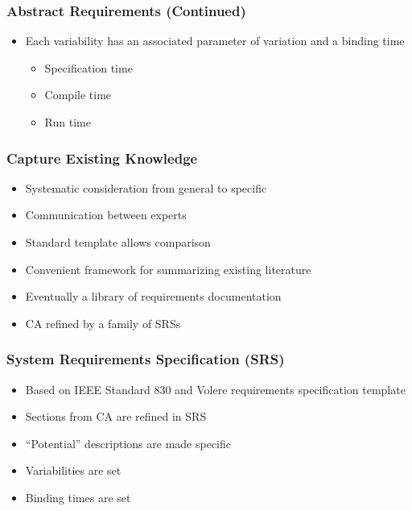 \documentclass[t,12pt,numbers,fleqn]{beamer}
\newcounter{temp}
\begin{document}

\begin{frame}

\frametitle{Abstract Requirements (Continued)}

\begin{itemize}
\item Each variability has an associated parameter of variation and a binding time
\begin{itemize}
\item Specification time
\item Compile time
\item Run time
\end{itemize}
\end{itemize}
\end{frame}


\begin{frame}

\frametitle{Capture Existing Knowledge}

\begin{itemize}
\item Systematic consideration from general to specific
\item Communication between experts
\item Standard template allows comparison
\item Convenient framework for summarizing existing literature
\item Eventually a library of requirements documentation
\item CA refined by a family of SRSs
\end{itemize}
\end{frame}

\begin{frame}

\frametitle{System Requirements Specification (SRS)}

\begin{itemize}

\item Based on IEEE Standard 830 and Volere requirements specification template
\item Sections from CA are refined in SRS
\item ``Potential'' descriptions are made specific
\item Variabilities are set
\item Binding times are set

\end{itemize}

\end{frame}
\end{document}
